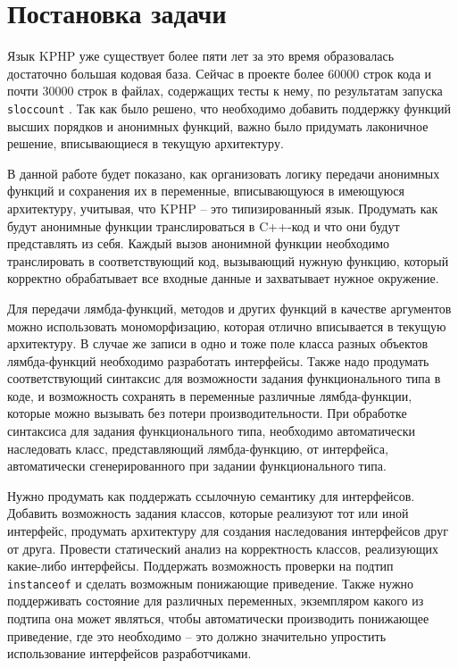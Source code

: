 
\startrelatedwork
\chapter{Постановка задачи}
Язык KPHP уже существует более пяти лет за это время образовалась достаточно большая кодовая база.
Сейчас в проекте более 60000 строк кода и почти 30000 строк в файлах, содержащих тесты к нему, по результатам запуска \verb|sloccount| \cite{sloccount}. Так как было решено, что необходимо добавить поддержку функций высших порядков и анонимных функций, важно было придумать лаконичное решение, вписывающиеся в текущую архитектуру.

В данной работе будет показано, как организовать логику передачи анонимных функций и сохранения их в переменные, вписывающуюся в имеющуюся архитектуру, учитывая, что KPHP -- это типизированный язык.
Продумать как будут анонимные функции транслироваться в C++-код и что они будут представлять из себя.
Каждый вызов анонимной функции необходимо транслировать в соответствующий код, вызывающий нужную функцию, который корректно обрабатывает все входные данные и захватывает нужное окружение.

Для передачи лямбда-функций, методов и других функций в качестве аргументов можно использовать мономорфизацию, которая отлично вписывается в текущую архитектуру.
В случае же записи в одно и тоже поле класса разных объектов лямбда-функций необходимо разработать интерфейсы.
Также надо продумать соответствующий синтаксис для возможности задания функционального типа в коде, и возможность сохранять в переменные различные лямбда-функции, которые можно вызывать без потери производительности.
При обработке синтаксиса для задания функционального типа, необходимо автоматически наследовать класс, представляющий лямбда-функцию, от интерфейса, автоматически сгенерированного при задании функционального типа. 

Нужно продумать как поддержать ссылочную семантику для интерфейсов.
Добавить возможность задания классов, которые реализуют тот или иной интерфейс, продумать архитектуру для создания наследования интерфейсов друг от друга.
Провести статический анализ на корректность классов, реализующих какие-либо интерфейсы.
Поддержать возможность проверки на подтип \verb|instanceof| и сделать возможным понижающие приведение.
Также нужно поддерживать состояние для различных переменных, экземпляром какого из подтипа она может являться, чтобы автоматически производить понижающее приведение, где это необходимо -- это должно значительно упростить использование интерфейсов разработчиками.

